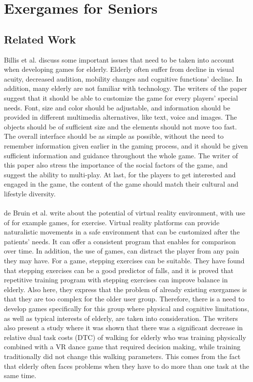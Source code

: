 \chapter{Exergames for Seniors}
\section{Related Work}
Billis et al. discuss some important issues that need to be taken into account when developing games for elderly. Elderly often suffer from decline in visual acuity, decreased audition, mobility changes and cognitive functions’ decline. In addition, many elderly are not familiar with technology. The writers of the paper suggest that it should be able to customize the game for every players’ special needs. Font, size and color should be adjustable, and information should be provided in different multimedia alternatives, like text, voice and images. The objects should be of sufficient size and the elements should not move too fast. The overall interface should be as simple as possible, without the need to remember information given earlier in the gaming process, and it should be given sufficient information and guidance throughout the whole game. The writer of this paper also stress the importance of the social factors of the game, and suggest the ability to multi-play. At last, for the players to get interested and engaged in the game, the content of the game should match their cultural and lifestyle diversity. \\ \\
de Bruin et al. write about the potential of virtual reality environment, with use of for example games, for exercise. Virtual reality platforms can provide naturalistic movements in a safe environment that can be customized after the patients' needs. It can offer a consistent program that enables for comparison over time. In addition, the use of games, can distract the player from any pain they may have. For a game, stepping exercises can be suitable. They have found that stepping exercises can be a good predictor of falls, and it is proved that repetitive training program with stepping exercises can improve balance in elderly. Also here, they express that the problem of already existing exergames is that they are too complex for the older user group. Therefore, there is a need to develop games specifically for this group where physical and cognitive limitations, as well as typical interests of elderly, are taken into consideration. The writers also present a study where it was shown that there was a significant decrease in relative dual task costs (DTC) of walking for elderly who was training physically combined with a VR dance game that required decision making, while training traditionally did not change this walking parameters. This comes from the fact that elderly often faces problems when they have to do more than one task at the same time. \\ \\
